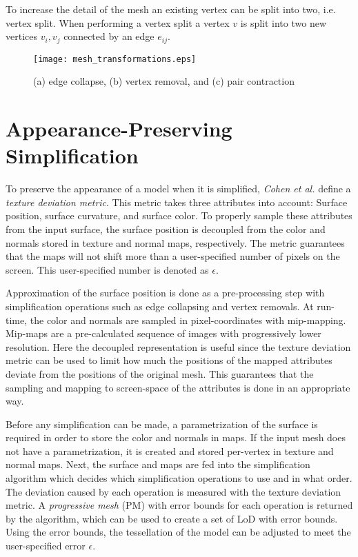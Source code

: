 To increase the detail of the mesh an existing vertex can be split into two, i.e. vertex split. When performing a vertex split a vertex $v$ is split into two new vertices $v_i, v_j$ connected by an edge $e_{ij}$. 

\begin{figure}[ht]
    \centering
    \texttt{[image: mesh\_transformations.eps]}
    \caption{(a) edge collapse, (b) vertex removal, and (c) pair contraction}
    \label{fig:mesh_transformations}
\end{figure}
\fi %

\section{Appearance-Preserving Simplification} \label{sec:appearance-preserving_simplification}
To preserve the appearance of a model when it is simplified, \emph{Cohen et al.} \cite{cohen1998appearance} define a \emph{texture deviation metric}. This metric takes three attributes into account: Surface position, surface curvature, and surface color. To properly sample these attributes from the input surface, the surface position is decoupled from the color and normals stored in texture and normal maps, respectively. The metric guarantees that the maps will not shift more than a user-specified number of pixels on the screen. This user-specified number is denoted as $\epsilon$.

Approximation of the surface position is done as a pre-processing step with simplification operations such as edge collapsing and vertex removals. At run-time, the color and normals are sampled in pixel-coordinates with mip-mapping. Mip-maps are a pre-calculated sequence of images with progressively lower resolution. Here the decoupled representation is useful since the texture deviation metric can be used to limit how much the positions of the mapped attributes deviate from the positions of the original mesh. This guarantees that the sampling and mapping to screen-space of the attributes is done in an appropriate way.

Before any simplification can be made, a parametrization of the surface is required in order to store the color and normals in maps. If the input mesh does not have a parametrization, it is created and stored per-vertex in texture and normal maps. Next, the surface and maps are fed into the simplification algorithm which decides which simplification operations to use and in what order. The deviation caused by each operation is measured with the texture deviation metric. A \emph{progressive mesh} (PM) with error bounds for each operation is returned by the algorithm, which can be used to create a set of LoD with error bounds. Using the error bounds, the tessellation of the model can be adjusted to meet the user-specified error $\epsilon$.

